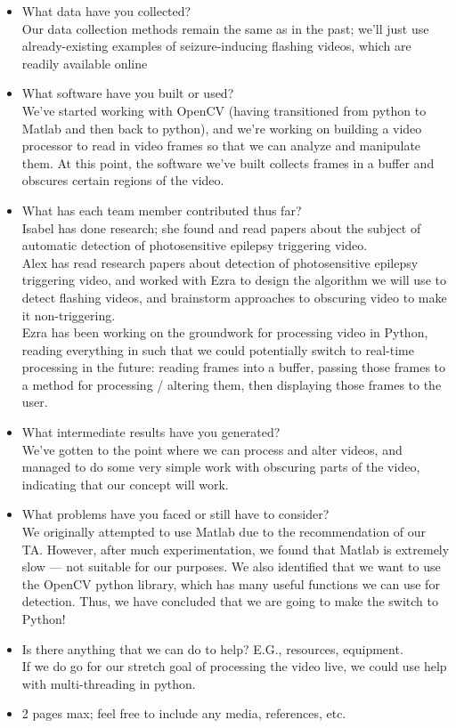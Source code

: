\begin{itemize}
  \item What data have you collected? \\ \newline
  Our data collection methods remain the same as in the past; we'll just use already-existing examples of seizure-inducing flashing videos, which are readily available online
  \item What software have you built or used? \\ \newline
  We've started working with OpenCV (having transitioned from python to Matlab and then back to python), and we're working on building a video processor to read in video frames so that we can analyze and manipulate them. At this point, the software we've built collects frames in a buffer and obscures certain regions of the video.
  \item What has each team member contributed thus far? \\ \newline
    Isabel has done research; she found and read papers about the subject of automatic detection of photosensitive epilepsy triggering video. \\
    Alex has read research papers about detection of photosensitive epilepsy triggering video, and worked with Ezra to design the algorithm we will use to detect flashing videos, and brainstorm approaches to obscuring video to make it non-triggering. \\ 
    Ezra has been working on the groundwork for processing video in Python, reading everything in such that we could potentially switch to real-time processing in the future: reading frames into a buffer, passing those frames to a method for processing / altering them, then displaying those frames to the user. \\
  \item What intermediate results have you generated? \\ \newline We've gotten to the point where we can process and alter videos, and managed to do some very simple work with obscuring parts of the video, indicating that our concept will work.  
  \item What problems have you faced or still have to consider?\\
  We originally attempted to use Matlab due to the recommendation of our TA. However, after much experimentation, we found that Matlab is extremely slow --- not suitable for our purposes. We also identified that we want to use the OpenCV python library, which has many useful functions we can use for detection. Thus, we have concluded that we are going to make the switch to Python!
  \item Is there anything that we can do to help? E.G., resources, equipment. \\ \newline
  If we do go for our stretch goal of processing the video live, we could use help with multi-threading in python.
  \item 2 pages max; feel free to include any media, references, etc.
\end{itemize}



